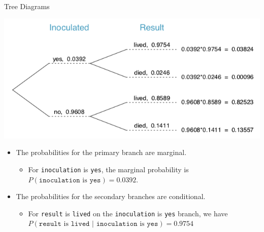 \begin{frame}{Tree Diagrams}
    \begin{center}
        \includegraphics[scale=0.3]{images/tree.png}
    \end{center}
    \begin{itemize}
        \item The probabilities for the primary branch are marginal.
        \begin{itemize}
            \item For \texttt{inoculation} is \texttt{yes}, the marginal probability is $P(\texttt{inoculation} \text{ is } \texttt{yes})=0.0392$.
        \end{itemize}
        \item The probabilities for the secondary branches are conditional.
        \begin{itemize}
            \item For \texttt{result} is \texttt{lived} on the \texttt{inoculation} is \texttt{yes} branch, we have $P(\texttt{result} \text{ is } \texttt{lived } |\texttt{ inoculation} \text{ is } \texttt{yes})=0.9754$
        \end{itemize}
    \end{itemize}
\end{frame}

